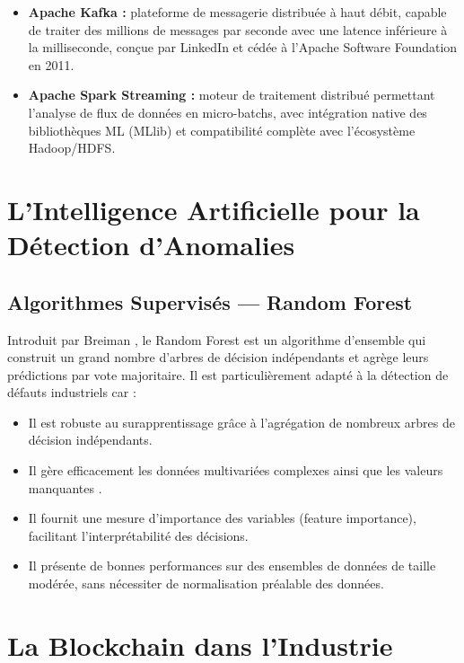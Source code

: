 \documentclass[12pt, a4paper, oneside]{report}
\begin{document}
\begin{itemize}
  \item \textbf{Apache Kafka \cite{kreps2011} :} plateforme de messagerie distribuée à haut débit,
  capable de traiter des millions de messages par seconde avec une latence inférieure à la
  milliseconde, conçue par LinkedIn et cédée à l'Apache Software Foundation en 2011.
  \item \textbf{Apache Spark Streaming \cite{spark} :} moteur de traitement distribué permettant
  l'analyse de flux de données en micro-batchs, avec intégration native des bibliothèques ML
  (MLlib) et compatibilité complète avec l'écosystème Hadoop/HDFS.
\end{itemize}

\section{L'Intelligence Artificielle pour la Détection d'Anomalies}

\subsection{Algorithmes Supervisés — Random Forest}

Introduit par Breiman \cite{breiman2001}, le Random Forest est un algorithme d'ensemble
qui construit un grand nombre d'arbres de décision indépendants et agrège leurs prédictions
par vote majoritaire. Il est particulièrement adapté à la détection de défauts industriels
car :

\begin{itemize}
    \item Il est robuste au surapprentissage grâce à l'agrégation de nombreux arbres de décision indépendants.
    \item Il gère efficacement les données multivariées complexes ainsi que les valeurs manquantes \cite{breiman2001, sklearn}.
    \item Il fournit une mesure d'importance des variables (feature importance), facilitant l'interprétabilité des décisions.
    \item Il présente de bonnes performances sur des ensembles de données de taille modérée, sans nécessiter de normalisation préalable des données.
\end{itemize}

\section{La Blockchain dans l'Industrie}
\end{document}

